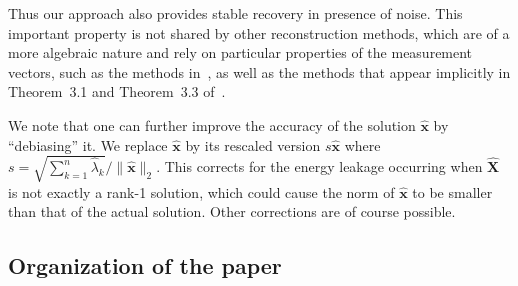 \documentclass[11pt]{article}
\newcommand{\<}{\langle}
\renewcommand{\>}{\rangle}
\newcommand{\bx}{\bm{x}}
\newcommand{\bX}{\bm{X}}
\numberwithin{equation}{section}
\newcommand{\ejc}[1]{\textcolor{red}{#1}}
\newcommand{\ts}[1]{\textcolor{blue}{#1}}
\begin{document}



Thus our approach also provides stable recovery in presence of
noise. This important property is not shared by other reconstruction
methods, which are of a more algebraic nature and rely on particular
properties of the measurement vectors, such as the methods
in~\cite{Fin04,BCE06,BBC09}, as well as the methods that appear
implicitly in Theorem~3.1 and Theorem~3.3 of~\cite{CESV}.

We note that one can further improve the accuracy of the solution
$\hat{\bx}$ by ``debiasing'' it. We replace $\hat{\bx}$ by its
rescaled version $s \hat{\bx}$ where $s = \sqrt{\sum_{k=1}^{n}
  \hat{\lambda}_k}/\|\hat{\bx}\|_2$.  This corrects for the energy
leakage occurring when $\hat{\bX}$ is not exactly a rank-1 solution,
which could cause the norm of $\hat{\bx}$ to be smaller than that of
the actual solution. Other corrections are of course possible. 

\subsection{Organization of the paper}
\end{document}
